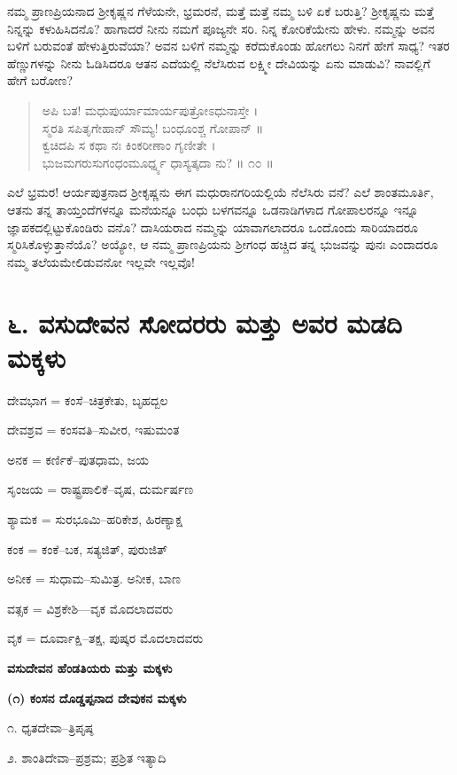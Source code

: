 ನಮ್ಮ ಪ್ರಾಣಪ್ರಿಯನಾದ ಶ್ರೀಕೃಷ್ಣನ ಗೆಳೆಯನೇ, ಭ್ರಮರನೆ, ಮತ್ತೆ ಮತ್ತೆ ನಮ್ಮ ಬಳಿ ಏಕೆ ಬರುತ್ತಿ? ಶ್ರೀಕೃಷ್ಣನು ಮತ್ತೆ ನಿನ್ನನ್ನು ಕಳುಹಿಸಿದನೊ? ಹಾಗಾದರೆ ನೀನು ನಮಗೆ ಪೂಜ್ಯನೇ ಸರಿ. ನಿನ್ನ ಕೋರಿಕೆಯೇನು ಹೇಳು. ನಮ್ಮನ್ನು ಅವನ ಬಳಿಗೆ ಬರುವಂತೆ ಹೇಳುತ್ತಿರುವೆಯಾ? ಅವನ ಬಳಿಗೆ ನಮ್ಮನ್ನು ಕರೆದುಕೊಂಡು ಹೋಗಲು ನಿನಗೆ ಹೇಗೆ ಸಾಧ್ಯ? ಇತರ ಹೆಣ್ಣುಗಳನ್ನು ನೀನು ಓಡಿಸಿದರೂ ಆತನ ಎದೆಯಲ್ಲಿ ನೆಲೆಸಿರುವ ಲಕ್ಷ್ಮೀ ದೇವಿಯನ್ನು ಏನು ಮಾಡುವಿ? ನಾವಲ್ಲಿಗೆ ಹೇಗೆ ಬರೋಣ?

\begin{verse}
ಅಪಿ ಬತ! ಮಧುಪುರ್ಯಾಮಾರ್ಯಪುತ್ರೋಽಧುನಾಸ್ತೇ ।\\ಸ್ಮರತಿ ಸಪಿತೃಗೇಹಾನ್ ಸೌಮ್ಯ! ಬಂಧೂಂಶ್ಚ ಗೋಪಾನ್ ॥\\ಕ್ವಚಿದಪಿ ಸ ಕಥಾ ನಃ ಕಿಂಕರೀಣಾಂ ಗೃಣೀತೇ ।\\ಭುಜಮಗರುಸುಗಂಧಂಮೂರ್ಧ್ನ್ಯ ಧಾಸ್ಯತ್ಕದಾ ನು? \num{॥ ೧೦ ॥}
\end{verse}

ಎಲೆ ಭ್ರಮರ! ಆರ್ಯಪುತ್ರನಾದ ಶ್ರೀಕೃಷ್ಣನು ಈಗ ಮಧುರಾನಗರಿಯಲ್ಲಿಯೆ ನೆಲೆಸಿರು ವನೆ? ಎಲೆ ಶಾಂತಮೂರ್ತಿ, ಆತನು ತನ್ನ ತಾಯ್ತಂದೆಗಳನ್ನೂ ಮನೆಯನ್ನೂ ಬಂಧು ಬಳಗವನ್ನೂ ಒಡನಾಡಿಗಳಾದ ಗೋಪಾಲರನ್ನೂ ಇನ್ನೂ ಜ್ಞಾಪಕದಲ್ಲಿಟ್ಟುಕೊಂಡಿರು ವನೊ? ದಾಸಿಯರಾದ ನಮ್ಮನ್ನು ಯಾವಾಗಲಾದರೂ ಒಂದೊಂದು ಸಾರಿಯಾದರೂ ಸ್ಮರಿಸಿಕೊಳ್ಳುತ್ತಾನೆಯೊ? ಅಯ್ಯೋ, ಆ ನಮ್ಮ ಪ್ರಾಣಪ್ರಿಯನು ಶ್ರೀಗಂಧ ಹಚ್ಚಿದ ತನ್ನ ಭುಜವನ್ನು ಪುನಃ ಎಂದಾದರೂ ನಮ್ಮ ತಲೆಯಮೇಲಿಡುವನೋ ಇಲ್ಲವೇ ಇಲ್ಲವೊ!


\section{೬. ವಸುದೇವನ ಸೋದರರು ಮತ್ತು ಅವರ ಮಡದಿ ಮಕ್ಕಳು}

ದೇವಭಾಗ = ಕಂಸೆ–ಚಿತ್ರಕೇತು, ಬೃಹದ್ಬಲ

ದೇವಶ್ರವ = ಕಂಸವತಿ–ಸುವೀರ, ಇಷುಮಂತ

ಅನಕ = ಕರ್ಣಿಕೆ–ಪುತಧಾಮ, ಜಯ

ಸೃಂಜಯ = ರಾಷ್ಟ್ರಪಾಲಿಕೆ–ವೃಷ, ದುರ್ಮರ್ಷಣ

ಶ್ಯಾಮಕ = ಸುರಭೂಮಿ–ಹರಿಕೇಶ, ಹಿರಣ್ಯಾಕ್ಷ

ಕಂಕ = ಕಂಕೆ–ಬಕ, ಸತ್ಯಜಿತ್, ಪುರುಜಿತ್​

ಅನೀಕ = ಸುಧಾಮ–ಸುಮಿತ್ರ. ಅನೀಕ, ಬಾಣ

ವತ್ಸಕ = ವಿಶ್ರಕೇಶಿ—ವೃಕ ಮೊದಲಾದವರು

ವೃಕ = ದೂರ್ವಾಕ್ಷಿ–ತಕ್ಷ, ಪುಷ್ಕರ ಮೊದಲಾದವರು

\begin{center}
\textbf{ವಸುದೇವನ ಹೆಂಡತಿಯರು ಮತ್ತು ಮಕ್ಕಳು}
\end{center}

\textbf{(೧) ಕಂಸನ ದೊಡ್ಡಪ್ಪನಾದ ದೇವುಕನ ಮಕ್ಕಳು}

೧. ಧೃತದೇವಾ–ತ್ರಿಪೃಷ್ಠ

೨. ಶಾಂತಿದೇವಾ–ಪ್ರಶ್ರಮ; ಪ್ರಶ್ರಿತ ಇತ್ಯಾದಿ

